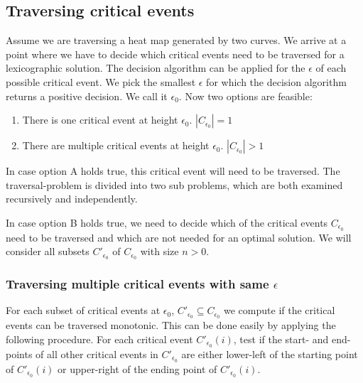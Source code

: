 \subsection{Traversing critical events}

Assume we are traversing a heat map generated by two curves. We arrive at a point where we have to decide which critical events need to be traversed for a lexicographic solution. The decision algorithm\cite{altgodau} can be applied for the $\epsilon$ of each possible critical event. We pick the smallest $\epsilon$ for which the decision algorithm returns a positive decision. We call it $\epsilon_0$. Now two options are feasible:

\begin{enumerate}[label=(\Alph*)]
	\item There is one critical event at height $\epsilon_0$. $|C_{\epsilon_0}| = 1$
	\item There are multiple critical events at height $\epsilon_0$. $|C_{\epsilon_0}| > 1$
\end{enumerate}

In case option A holds true, this critical event will need to be traversed. The traversal-problem is divided into two sub problems, which are both examined recursively and independently.

In case option B holds true, we need to decide which of the critical events $C_{\epsilon_0}$ need to be traversed and which are not needed for an optimal solution. We will consider all subsets $C'_{\epsilon_0}$ of $C_{\epsilon_0}$ with size $n>0$.

\subsubsection{Traversing multiple critical events with same $\epsilon$}

For each subset of critical events at $\epsilon_0$, $C'_{\epsilon_0} \subseteq C_{\epsilon_0}$ we compute if the critical events can be traversed monotonic. This can be done easily by applying the following procedure. For each critical event $C'_{\epsilon_0}(i)$, test if the start- and end-points of all other critical events in $C'_{\epsilon_0}$ are either lower-left of the starting point of $C'_{\epsilon_0}(i)$ or upper-right of the ending point of $C'_{\epsilon_0}(i)$.

